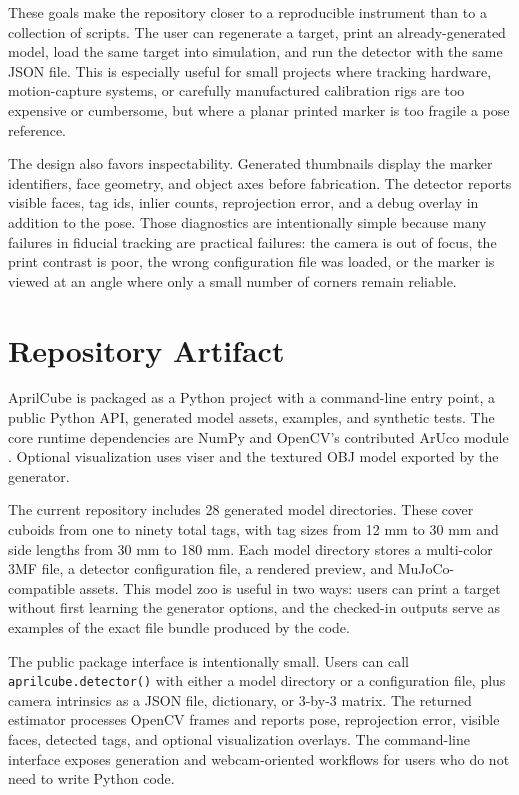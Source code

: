 \documentclass[conference]{IEEEtran}
\begin{document}
These goals make the repository closer to a reproducible instrument than to a collection of scripts. The user can regenerate a target, print an already-generated model, load the same target into simulation, and run the detector with the same JSON file. This is especially useful for small projects where tracking hardware, motion-capture systems, or carefully manufactured calibration rigs are too expensive or cumbersome, but where a planar printed marker is too fragile a pose reference.

The design also favors inspectability. Generated thumbnails display the marker identifiers, face geometry, and object axes before fabrication. The detector reports visible faces, tag ids, inlier counts, reprojection error, and a debug overlay in addition to the pose. Those diagnostics are intentionally simple because many failures in fiducial tracking are practical failures: the camera is out of focus, the print contrast is poor, the wrong configuration file was loaded, or the marker is viewed at an angle where only a small number of corners remain reliable.

\section{Repository Artifact}
AprilCube is packaged as a Python project with a command-line entry point, a public Python API, generated model assets, examples, and synthetic tests. The core runtime dependencies are NumPy and OpenCV's contributed ArUco module \cite{opencv}. Optional visualization uses viser and the textured OBJ model exported by the generator.

The current repository includes 28 generated model directories. These cover cuboids from one to ninety total tags, with tag sizes from 12 mm to 30 mm and side lengths from 30 mm to 180 mm. Each model directory stores a multi-color 3MF file, a detector configuration file, a rendered preview, and MuJoCo-compatible assets. This model zoo is useful in two ways: users can print a target without first learning the generator options, and the checked-in outputs serve as examples of the exact file bundle produced by the code.

The public package interface is intentionally small. Users can call \texttt{aprilcube.detector()} with either a model directory or a configuration file, plus camera intrinsics as a JSON file, dictionary, or 3-by-3 matrix. The returned estimator processes OpenCV frames and reports pose, reprojection error, visible faces, detected tags, and optional visualization overlays. The command-line interface exposes generation and webcam-oriented workflows for users who do not need to write Python code.
\end{document}
